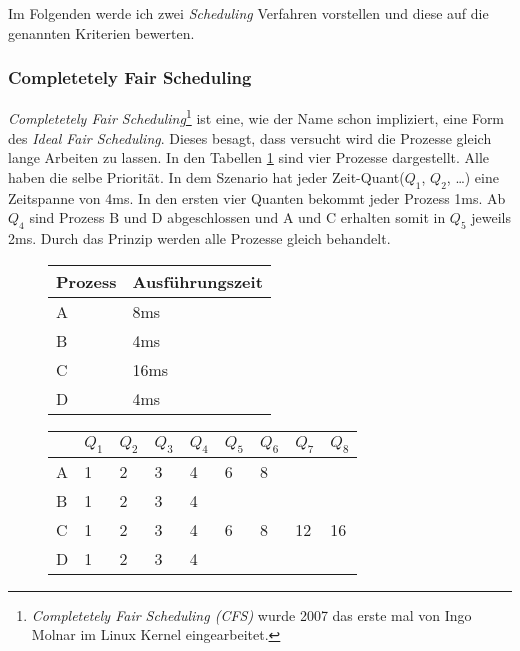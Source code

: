 Im Folgenden werde ich zwei \textit{Scheduling} Verfahren vorstellen und diese auf die genannten Kriterien bewerten.
\newpage

\subsubsection{Completetely Fair Scheduling}
\textit{Completetely Fair Scheduling}\footnote{\textit{Completetely Fair Scheduling (CFS)} wurde 2007 das erste mal von Ingo Molnar im Linux Kernel eingearbeitet.} ist eine, wie der Name schon impliziert, eine Form des \textit{Ideal Fair Scheduling}. Dieses besagt, dass versucht wird die Prozesse gleich lange Arbeiten zu lassen. In den Tabellen \ref{Fair Scheduling} sind vier Prozesse dargestellt. Alle haben die selbe Priorität. In dem Szenario hat jeder Zeit-Quant($Q_1$, $Q_2$, \dots) eine Zeitspanne von 4ms. In den ersten vier Quanten bekommt jeder Prozess 1ms. Ab $Q_4$ sind Prozess B und D abgeschlossen und A und C erhalten somit in $Q_5$ jeweils 2ms. Durch das Prinzip werden alle Prozesse gleich behandelt.
\begin{figure}[h]
    \centering
    \begin{tabular}{| l | l |}
        \hline
        Prozess & Ausführungszeit\\
        \hline
        A & 8ms\\
        \hline
        B & 4ms\\
        \hline
        C & 16ms\\
        \hline
        D & 4ms\\
        \hline
    \end{tabular}
    \begin{tabular}{| x{1em} | x{1em} | x{1em} | x{1em} | x{1em} | x{1em} | x{1em} | x{1em} | x{1em} |}
        \hline
        & $Q_1$ & $Q_2$ & $Q_3$ & $Q_4$ & $Q_5$ & $Q_6$ & $Q_7$ & $Q_8$\\
        \hline
        A & 1 & 2 & 3 & 4 & 6 & 8 & &\\
        \hline
        B & 1 & 2 & 3 & 4 & & & &\\
        \hline
        C & 1 & 2 & 3 & 4 & 6 & 8 & 12 & 16\\
        \hline
        D & 1 & 2 & 3 & 4 & & & &\\
        \hline
    \end{tabular}
    \label{Fair Scheduling}
\end{figure}

